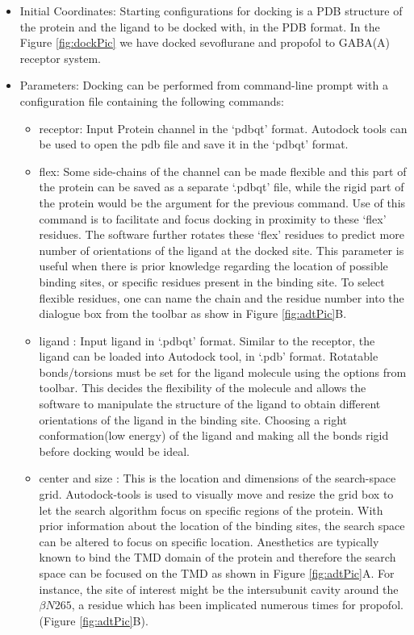 \documentclass[12pt]{article}
\begin{document}
\begin{itemize}
	\item Initial Coordinates: Starting configurations for docking is a PDB structure of the protein and the ligand to be docked with, in the PDB format. In the Figure \ref{fig:dockPic} we have docked sevoflurane and propofol to GABA(A) receptor system.
	\item Parameters:  Docking can be performed from command-line prompt with a configuration file containing the following commands:
		\begin{itemize}
			\item receptor: Input Protein channel in the `pdbqt' format. Autodock tools can be used to open the pdb file and save it in the `pdbqt' format. 
			\item flex: Some side-chains of the channel can be made flexible and this part of the protein can be saved as a separate `.pdbqt' file, while the rigid part of the protein would be the argument for the previous command. Use of this command is to facilitate and focus docking in proximity to these `flex' residues. The software further rotates these `flex' residues to predict more number of orientations of the ligand at the docked site. This parameter is useful when  there is  prior knowledge regarding the location of possible binding sites, or specific residues present in the binding site. To select flexible residues, one can name the chain and the residue number into the dialogue box from the toolbar as show in Figure \ref{fig:adtPic}B.
			\item ligand : Input ligand in `.pdbqt' format. Similar to the receptor, the ligand can be loaded into Autodock tool, in `.pdb' format. Rotatable bonds/torsions must be set for the ligand molecule using the options from toolbar. This decides the flexibility of the molecule and allows the software to manipulate the structure of the ligand to obtain different orientations of the ligand in the binding site. Choosing a right conformation(low energy) of the ligand and making all the bonds rigid before docking would be ideal.
			\item center and size : This is the location and dimensions of the search-space grid. Autodock-tools is used to visually move and resize the grid box to let the search algorithm focus on specific regions of the protein.  With prior information about the location of the binding sites, the search space can be altered to focus on specific location. Anesthetics are typically known to bind the TMD domain of the protein and therefore the search space can be focused on the TMD as shown in Figure \ref{fig:adtPic}A. For instance, the site of interest might be the intersubunit cavity around the $\beta N265$, a residue which has been implicated numerous times for propofol\cite{Jurd2002}.  (Figure \ref{fig:adtPic}B). %

\end{itemize}
\end{itemize}
\end{document}
